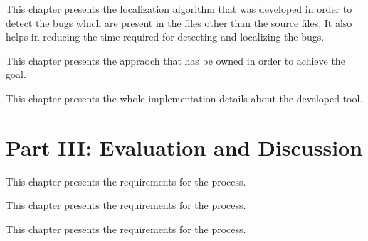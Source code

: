 \noindent  This chapter presents the localization algorithm that was developed
in order to detect the bugs which are present in the files other than the source files. 
It also helps in reducing the time required for detecting and localizing the bugs.

  \vspace{1mm}

\noindent  This chapter presents the appraoch that has be owned in order to 
achieve the goal.

  \vspace{1mm}

\noindent  This chapter presents the whole implementation details about the developed tool.
\section*{Part III: Evaluation and Discussion}

  \vspace{1mm}

\noindent  This chapter presents the requirements for the process. \\

  \vspace{1mm}

\noindent  This chapter presents the requirements for the process. \\

  \vspace{1mm}

\noindent  This chapter presents the requirements for the process. \\
